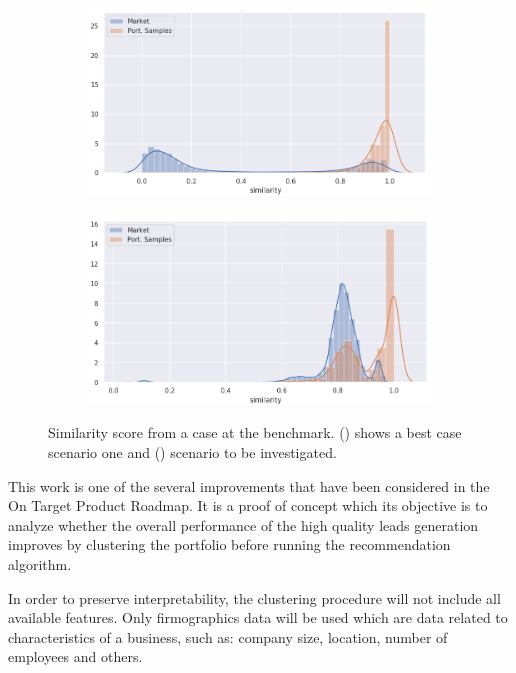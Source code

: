 \begin{figure}[!ht]
    \begin{subfigure}{\linewidth}
        \centering
        \includegraphics[width=10cm]{fig/ch1-simi-dist-expected.png}
        \caption{}
        \label{fig:simi-dist:expected}
    \end{subfigure}
    \begin{subfigure}{\linewidth}
        \centering
        \includegraphics[width=10cm]{fig/ch1-simi-dist-to-investigate.png}
        \caption{}
        \label{fig:simi-dist:to-investigate}
    \end{subfigure}
    \caption{Similarity score from a case at the benchmark. () shows a best case scenario one and () scenario to be investigated.}
    \label{fig:simi-dist}
\end{figure}

This work is one of the several improvements that have been considered in the On Target Product Roadmap. It is a proof of concept which its objective is to analyze whether the overall performance of the high quality leads generation improves by clustering the portfolio before running the recommendation algorithm. 

In order to preserve interpretability, the clustering procedure will not include all available features. Only firmographics data will be used \cite{wikipedia_firmographics} which are data related to characteristics of a business, such as: company size, location, number of employees and others.


